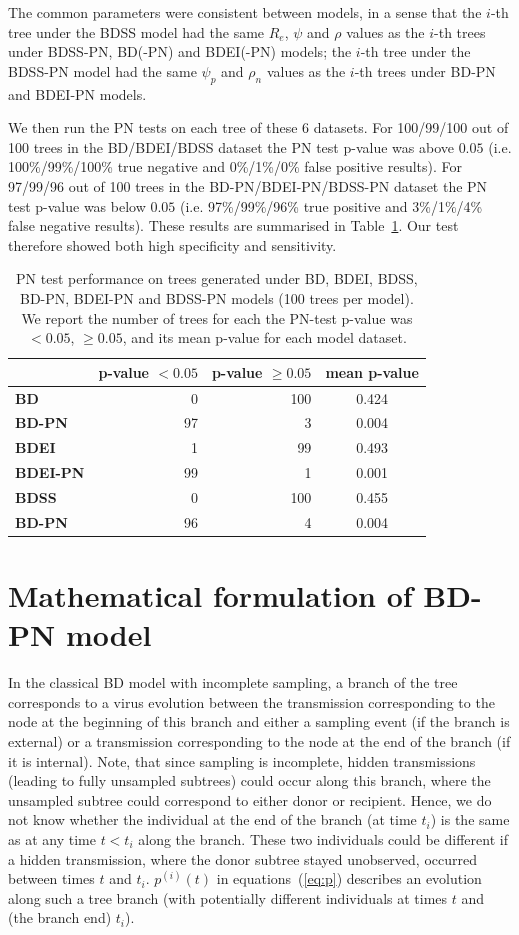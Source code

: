\documentclass[a4paper,10pt]{article}
\begin{document}
The common parameters were consistent between models, in a sense that the $i$-th tree under the BDSS model had the same $R_e$, $\psi$ and $\rho$ values as the $i$-th trees under BDSS-PN, BD(-PN) and BDEI(-PN) models; the $i$-th tree under the BDSS-PN model had the same $\psi_p$ and $\rho_n$ values as the $i$-th trees under BD-PN and BDEI-PN models.

We then run the PN tests on each tree of these 6 datasets. For 100/99/100 out of 100 trees in the BD/BDEI/BDSS dataset the PN test p-value was above $0.05$ (i.e. 100\%/99\%/100\% true negative and 0\%/1\%/0\% false positive results). For 97/99/96 out of 100 trees in the BD-PN/BDEI-PN/BDSS-PN dataset the PN test p-value was below $0.05$ (i.e. 97\%/99\%/96\% true positive and 3\%/1\%/4\% false negative results). These results are summarised in Table~\ref{tbl:pntest}. Our test therefore showed both high specificity and sensitivity.

\begin{table}[!h]\centering
\small
\caption{PN test performance on trees generated under BD, BDEI, BDSS, BD-PN, BDEI-PN and BDSS-PN models (100 trees per model). We report the number of trees for each the PN-test p-value was $<0.05$, $\geq 0.05$, and its mean p-value for each model dataset.}
\begin{tabular}{l|r|r|c}
 & \textbf{p-value $<0.05$} & \textbf{p-value $\geq0.05$} & \textbf{mean p-value} \\
  \midrule
\textbf{BD}& 0 & 100 & 0.424 \\
\textbf{BD-PN}& 97 & 3 & 0.004 \\
  \midrule
\textbf{BDEI}& 1 & 99 & 0.493 \\
\textbf{BDEI-PN}& 99 & 1 & 0.001 \\
  \midrule
\textbf{BDSS}& 0 & 100 & 0.455 \\
\textbf{BD-PN}& 96 & 4 & 0.004 \\
\end{tabular}
\label{tbl:pntest}
\end{table}
 

\section{Mathematical formulation of BD-PN model}
In the classical BD model with incomplete sampling, a branch of the tree corresponds to a virus evolution between the transmission corresponding to the node at the beginning of this branch and either a sampling event (if the branch is external) or a transmission corresponding to the node at the end of the branch (if it is internal). Note, that since sampling is incomplete, hidden transmissions (leading to fully unsampled subtrees) could occur along this branch, where the unsampled subtree could correspond to either donor or recipient.  Hence, we do not know whether the individual at the end of the branch (at time $t_i$) is the same as at any time $t < t_i$ along the branch. These two individuals could be different if a hidden transmission, where the donor subtree stayed unobserved, occurred between times $t$ and $t_i$. $p^{(i)}(t)$ in equations~(\ref{eq:p}) describes an evolution along such a tree branch (with potentially different individuals at times $t$ and (the branch end) $t_i$).
\end{document}
